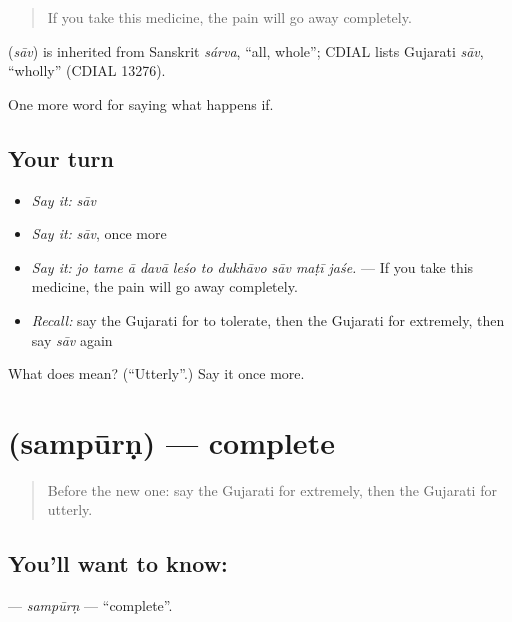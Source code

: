 \begin{quote}
If you take this medicine, the pain will go away completely.
\end{quote}

\begin{cousinweb}
\textbf{} (\emph{sāv}) is inherited from Sanskrit \emph{sárva}, \textquotedblleft{}all, whole\textquotedblright{}; CDIAL lists Gujarati \emph{sāv}, \textquotedblleft{}wholly\textquotedblright{} (CDIAL 13276).
\end{cousinweb}

\begin{grammarlens}[title={What you've built}]
One more word for saying what happens if.
\end{grammarlens}

\subsection*{Your turn}
\begin{itemize}
\raggedright
  \item \emph{Say it:} \emph{sāv}
  \item \emph{Say it:} \emph{sāv}, once more
  \item \emph{Say it:} \emph{jo tame ā davā leśo to dukhāvo sāv maṭī jaśe.} — If you take this medicine, the pain will go away completely.
  \item \emph{Recall:} say the Gujarati for to tolerate, then the Gujarati for extremely, then say \emph{sāv} again
\end{itemize}

\begin{tcolorbox}[breakable,colback=teal!4,colframe=teal!35!black,title={Before you move on}]
What does  mean? (\textquotedblleft{}Utterly\textquotedblright{}.) Say it once more.
\end{tcolorbox}
\section[\texorpdfstring{\gu{સંપૂર્ણ} (sampūrṇ)}{સંપૂર્ણ (sampūrṇ)}]{ (sampūrṇ) — complete}

\label{lesson:GU-C379-sampurn}



\begin{quote}
Before the new one: say the Gujarati for extremely, then the Gujarati for utterly.
\end{quote}

\subsection*{You'll want to know: }
\textbf{} — \emph{sampūrṇ} — \textquotedblleft{}complete\textquotedblright{}.

